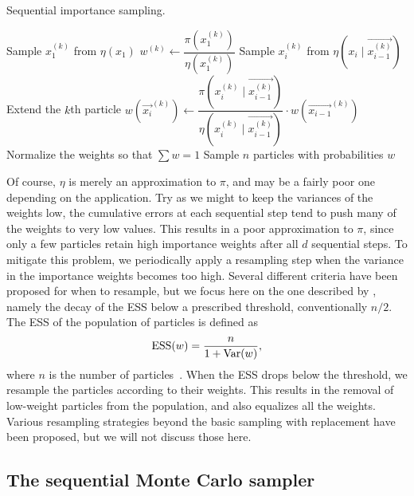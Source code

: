 \begin{algorithm}
  \caption{Sequential importance sampling.}
  \begin{algorithmic}
      \State Sample $x_1^{(k)}$ from $\eta(x_1)$
      \State $w^{(k)} \gets \dfrac{\pi\left(x_1^{(k)}\right)}{\eta\left(x_1^{(k)}\right)}$
    \EndFor
        \State Sample $x_i^{(k)}$ from $\eta\left(x_i \mid \vec{x_{i-1}^{(k)}}\right)$
        \Comment Extend the $k$th particle
        \State $w(\vec{x_i}^{(k)}) \gets \dfrac{\pi\left(x_i^{(k)} \mid \vec{x_{i-1}^{(k)}}\right)}{\eta\left(x_i^{(k)} \mid \vec{x_{i-1}^{(k)}}\right)} \cdot w(\vec{x_{i-1}}^{(k)})$
      \EndFor
      \State Normalize the weights so that $\sum w = 1$
    \EndFor
    \State Sample $n$ particles with probabilities $w$
  \end{algorithmic}
  \label{alg:sis}
\end{algorithm}

Of course, $\eta$ is merely an approximation to $\pi$, and may be a fairly poor
one depending on the application. Try as we might to keep the variances of the
weights low, the cumulative errors at each sequential step tend to push many of
the weights to very low values. This results in a poor approximation to $\pi$,
since only a few particles retain high importance weights after all $d$
sequential steps. To mitigate this problem, we periodically apply a resampling
step when the variance in the importance weights becomes too high. Several
different criteria have been proposed for when to resample, but we focus here
on the one described by \textcite{liu2008monte}, namely the decay of the
\gls{ESS} below a prescribed threshold, conventionally $n/2$. The \gls{ESS} of
the population of particles is defined as
\[
  \operatorname{ESS}(w) = \frac{n}{1 + \operatorname{Var}(w)},
\]
where $n$ is the number of particles~\autocite{liu2008monte}. When the
\gls{ESS} drops below the threshold, we resample the particles according to
their weights. This results in the removal of low-weight particles from the
population, and also equalizes all the weights. Various resampling strategies
beyond the basic sampling with replacement have been proposed, but we will not
discuss those here. 

\subsection{The sequential Monte Carlo sampler}
\label{subsec:smcsamp}

